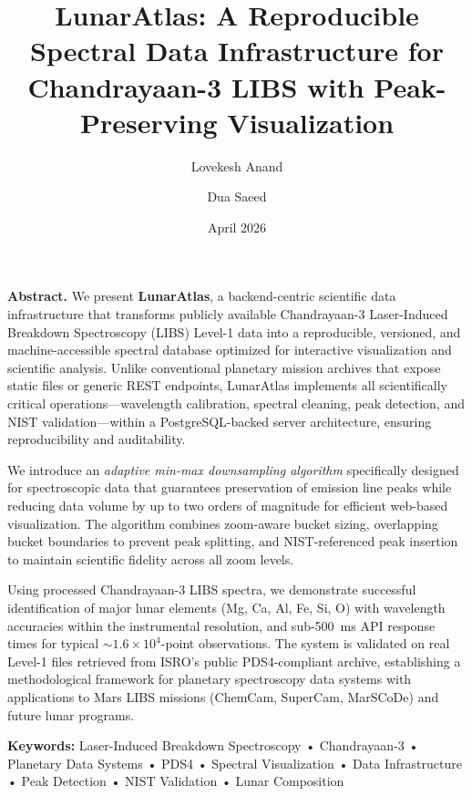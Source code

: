 \documentclass[11pt,a4paper]{article}
\title{\vspace{-8mm}\sffamily\bfseries\LARGE
LunarAtlas: A Reproducible Spectral Data Infrastructure for Chandrayaan-3 LIBS with Peak-Preserving Visualization
\vspace{2mm}}
\author[1]{Lovekesh Anand}
\author[1]{Dua Saeed}
\affil[1]{\small\sffamily Independent Researchers, India}
\affil[ ]{\vspace{2mm}}
\date{\sffamily April 2026}
\begin{document}
\maketitle
\thispagestyle{firstpage}
\vspace{-6mm}

\begin{tcolorbox}[
  colback=black!3,
  colframe=black!30,
  boxrule=0.5pt,
  arc=2pt,
  left=8pt,
  right=8pt,
  top=8pt,
  bottom=8pt,
  before skip=8pt,
  after skip=12pt
]
\small\sffamily
\textbf{Abstract.} We present \textbf{LunarAtlas}, a backend-centric scientific data infrastructure that transforms publicly available Chandrayaan-3 Laser-Induced Breakdown Spectroscopy (LIBS) Level-1 data into a reproducible, versioned, and machine-accessible spectral database optimized for interactive visualization and scientific analysis. Unlike conventional planetary mission archives that expose static files or generic REST endpoints, LunarAtlas implements all scientifically critical operations—wavelength calibration, spectral cleaning, peak detection, and NIST validation—within a PostgreSQL-backed server architecture, ensuring reproducibility and auditability.

We introduce an \textit{adaptive min-max downsampling algorithm} specifically designed for spectroscopic data that guarantees preservation of emission line peaks while reducing data volume by up to two orders of magnitude for efficient web-based visualization. The algorithm combines zoom-aware bucket sizing, overlapping bucket boundaries to prevent peak splitting, and NIST-referenced peak insertion to maintain scientific fidelity across all zoom levels.

Using processed Chandrayaan-3 LIBS spectra, we demonstrate successful identification of major lunar elements (Mg, Ca, Al, Fe, Si, O) with wavelength accuracies within the instrumental resolution, and sub-\SI{500}{ms} API response times for typical $\sim 1.6\times10^{4}$-point observations. The system is validated on real Level-1 files retrieved from ISRO's public PDS4-compliant archive, establishing a methodological framework for planetary spectroscopy data systems with applications to Mars LIBS missions (ChemCam, SuperCam, MarSCoDe) and future lunar programs.

\vspace{4pt}
\textbf{Keywords:} Laser-Induced Breakdown Spectroscopy • Chandrayaan-3 • Planetary Data Systems • PDS4 • Spectral Visualization • Data Infrastructure • Peak Detection • NIST Validation • Lunar Composition
\end{tcolorbox}
\end{document}
